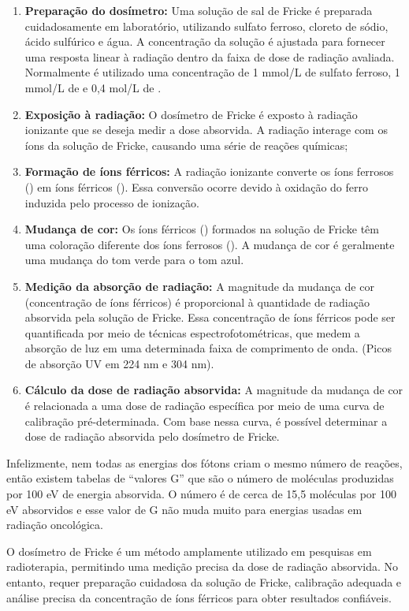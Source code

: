 \documentclass[11pt,a4paper]{article}
\begin{document}
		\begin{enumerate}
			\item \textbf{Preparação do dosímetro:} Uma solução de sal de Fricke é preparada cuidadosamente em laboratório, utilizando sulfato ferroso, cloreto de sódio, ácido sulfúrico e água. A concentração da solução é ajustada para fornecer uma resposta linear à radiação dentro da faixa de dose de radiação avaliada. Normalmente é utilizado uma concentração de 1 mmol/L de sulfato ferroso, 1 mmol/L de  e 0,4 mol/L de .
			\item \textbf{Exposição à radiação:} O dosímetro de Fricke é exposto à radiação ionizante que se deseja medir a dose absorvida. A radiação interage com os íons da solução de Fricke, causando uma série de reações químicas;
			\item \textbf{Formação de íons férricos:} A radiação ionizante converte os íons ferrosos () em íons férricos (). Essa conversão ocorre devido à oxidação do ferro induzida pelo processo de ionização.
			\item \textbf{Mudança de cor:} Os íons férricos () formados na solução de Fricke têm uma coloração diferente dos íons ferrosos (). A mudança de cor é geralmente uma mudança do tom verde para o tom azul.
			\item \textbf{Medição da absorção de radiação:} A magnitude da mudança de cor (concentração de íons férricos) é proporcional à quantidade de radiação absorvida pela solução de Fricke. Essa concentração de íons férricos pode ser quantificada por meio de técnicas espectrofotométricas, que medem a absorção de luz em uma determinada faixa de comprimento de onda. (Picos de absorção UV em 224 nm e 304 nm).
			\item \textbf{Cálculo da dose de radiação absorvida:} A magnitude da mudança de cor é relacionada a uma dose de radiação específica por meio de uma curva de calibração pré-determinada. Com base nessa curva, é possível determinar a dose de radiação absorvida pelo dosímetro de Fricke.
		\end{enumerate}

		Infelizmente, nem todas as energias dos fótons criam o mesmo número de reações, então existem tabelas de “valores G” que são o número de moléculas produzidas por 100 eV de energia absorvida. O número é de cerca de 15,5 moléculas por 100 eV absorvidos e esse valor de G não muda muito para energias usadas em radiação oncológica.

		O dosímetro de Fricke é um método amplamente utilizado em pesquisas em radioterapia, permitindo uma medição precisa da dose de radiação absorvida. No entanto, requer preparação cuidadosa da solução de Fricke, calibração adequada e análise precisa da concentração de íons férricos para obter resultados confiáveis.
\end{document}
